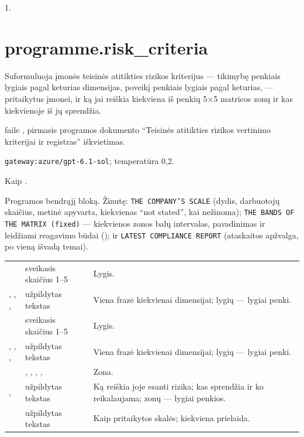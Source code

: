  1.


\section{programme.risk\_criteria}\label{sec:aprompts:programme-risk_criteria}

 Suformuluoja įmonės teisinės atitikties rizikos kriterijus ---
tikimybę penkiais lygiais pagal keturias dimensijas, poveikį penkiais lygiais pagal keturias, ---
pritaikytus įmonei, ir ką jai reiškia kiekviena iš penkių 5×5 matricos zonų ir kas kiekvienoje
iš jų sprendžia.

  faile , pirmasis programos
dokumento \enquote{Teisinės atitikties rizikos vertinimo kriterijai ir registras} iškvietimas.

 \texttt{gateway:azure/gpt-6.1-sol}; temperatūra 0,2.

 Kaip .

 Programos bendrąjį bloką. Žinutę:
\texttt{THE COMPANY'S SCALE} (dydis, darbuotojų skaičius, metinė apyvarta, kiekvienas
\enquote{not stated}, kai nežinoma); \texttt{THE BANDS OF THE MATRIX (fixed)} --- kiekvienos
zonos balų intervalas, pavadinimas ir leidžiami reagavimo būdai (); ir
\texttt{LATEST COMPLIANCE REPORT} (ataskaitos apžvalga, po vieną išvadą temai).

\par\nopagebreak
\begin{xltabular}{\textwidth}{@{}L{44mm}L{34mm}Y@{}}
\toprule
{} &  &  \\
\midrule
\endhead
\bottomrule
\endlastfoot
{} & sveikasis skaičius 1--5 & Lygis. \\
, , ,  & užpildytas tekstas & Viena frazė kiekvienai dimensijai; lygių --- lygiai penki. \\
 & sveikasis skaičius 1--5 & Lygis. \\
, , ,  & užpildytas tekstas & Viena frazė kiekvienai dimensijai; lygių --- lygiai penki. \\
 & , , , ,  & Zona. \\
,  & užpildytas tekstas & Ką reiškia joje esanti rizika; kas sprendžia ir ko reikalaujama; zonų --- lygiai penkios. \\
 & užpildytas tekstas & Kaip pritaikytos skalės; kiekviena prielaida. \\
\end{xltabular}

